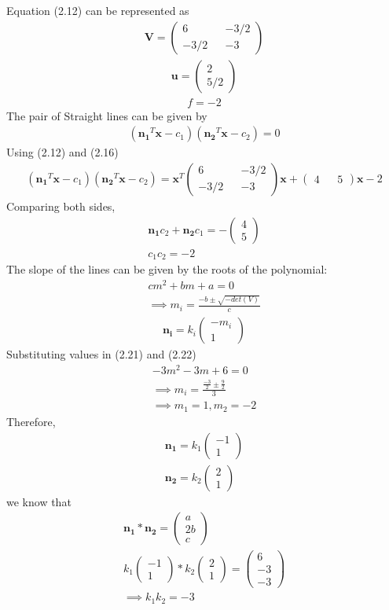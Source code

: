 \documentclass[journal,13pt,twocolumn]{IEEEtran}
\newcommand{\myvec}[1]{\ensuremath{\begin{pmatrix}#1\end{pmatrix}}}
\renewcommand{\vec}[1]{\mathbf{#1}}
\begin{document}
Equation (2.12) can be represented as 
\begin{align}
\vec{V}=\myvec{6 && -3/2\\ -3/2 && -3}
\end{align}
\begin{align}
\vec{u}=\myvec{2\\5/2}
\end{align}
\begin{align}
f= -2
\end{align}
The pair of Straight lines can be given by
\begin{align}
(\vec{n_1}^T\vec{x}-c_1)(\vec{n_2}^T\vec{x}-c_2)=0
\end{align}
Using (2.12) and (2.16)
\begin{align}
(\vec{n_1}^T\vec{x}-c_1)(\vec{n_2}^T\vec{x}-c_2)= \vec{x}^T \myvec{6 && -3/2 \\ -3/2 && -3} \vec{x} + \myvec{4 && 5}\vec{x} -2
\end{align}
Comparing both sides,
\begin{align}
\vec{n_1}c_2 + \vec{n_2}c_1 = -\myvec{4 \\ 5}\\
c_1c_2 = -2
\end{align}
The slope of the lines can be given by the roots of the polynomial:
\begin{align}
cm^2 + bm + a = 0\\
\implies m_i=\frac{-b\pm\sqrt{-det(V)}}{c}
\end{align}
\begin{align}
\vec{n_i} = k_i\myvec{-m_i \\ 1}
\end{align}
Substituting values in (2.21) and (2.22)
\begin{align}
-3m^2 -3m +6 = 0\\
\implies m_i = \frac{\frac{-3}{2}\pm \frac{9}{2}}{3}\\
\implies m_1 = 1 , m_2 = -2
\end{align}
Therefore,
\begin{align}
\vec{n_1} = k_1 \myvec{-1 \\ 1}\\
\vec{n_2} = k_2 \myvec{2 \\ 1}
\end{align}
we know that
\begin{align}
\vec{n_1} * \vec{n_2} =\myvec{a\\2b\\c}\\
k_1 \myvec{-1 \\ 1} *  k_2 \myvec{2 \\ 1} = \myvec{6\\-3\\-3}\\
\implies k_1k_2 = -3
\end{align}
\end{document}
